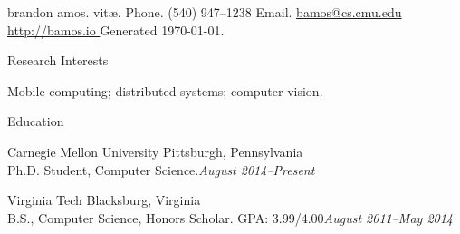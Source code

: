 \documentclass[letter]{article}
\begin{document}
{\huge brandon amos. vit\ae.} \hfill
{Phone.} {\small (540) 947--1238} \hspace{2mm}
{Email.} {\small \href{mailto: bamos@cs.cmu.edu }{ bamos@cs.cmu.edu }} \\
\url{ http://bamos.io } \hfill Generated \today.
\vspace{3mm}

\medskip

\begin{minipage}{\textwidth}
{\huge Research Interests }


  Mobile computing; distributed systems; computer vision.
  \bigskip

\end{minipage}\medskip

\begin{minipage}{\textwidth}
{\huge Education }


  
    {\large Carnegie Mellon University } \hfill Pittsburgh, Pennsylvania \\
    Ph.D. Student, Computer Science.\hfill {\it August 2014--Present}
    \bigskip
  
    {\large Virginia Tech } \hfill Blacksburg, Virginia \\
    B.S., Computer Science, Honors Scholar.
      GPA: 3.99/4.00\hfill {\it August 2011--May 2014}
    \bigskip
  

\end{minipage}\medskip
\end{document}
